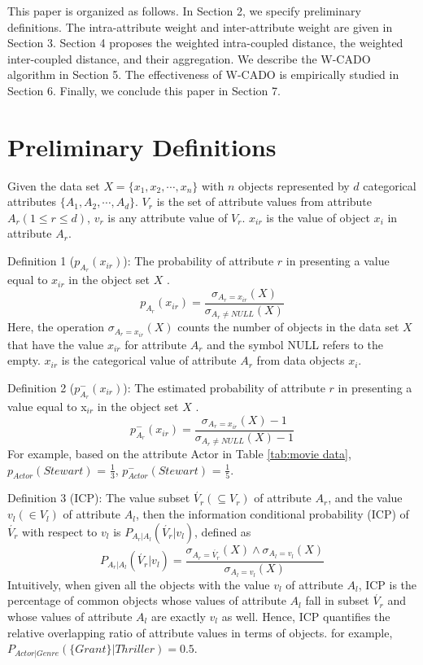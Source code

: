 \documentclass[review]{elsarticle}
\begin{document}
This paper is organized as follows. In Section 2, we specify preliminary definitions. The intra-attribute weight and inter-attribute weight are given in Section 3. Section 4 proposes the weighted intra-coupled distance, the weighted inter-coupled distance, and their aggregation. We describe the W-CADO algorithm in Section 5. The effectiveness of W-CADO is empirically studied in Section 6. Finally, we conclude this paper in Section 7.

\section{Preliminary Definitions}
Given the data set ${X} = \{x_1,x_2,\cdots,x_n\}$ with $n$ objects represented by $d$ categorical attributes $\{A_1,A_2,\cdots,A_d\}$. $V_r$ is the set of attribute values from attribute $A_r (1 \leq r \leq d)$, $v_r$ is any attribute value of $V_r$. $x_{ir}$ is the value of object $x_i$ in attribute $A_r$.

Definition 1 ($p_{A_r}(x_{ir})$): The probability of attribute $r$ in presenting a value equal to $x_{ir}$ in the object set $X$ \cite{TiagoC2015SimilarityMeasure}.
\begin{equation}
p_{A_r}(x_{ir}) = \frac{\sigma_{A_r = x_{ir}}(X)}{\sigma_{A_r \neq NULL}(X)}
\label{equ1}
\end{equation}
Here, the operation $\sigma_{A_r = x_{ir}}(X)$ counts the number of objects in the data set $X$ that have the value $x_{ir}$ for attribute $A_{r}$ and the symbol NULL refers to the empty. $x_{ir}$ is the categorical value of attribute $A_{r}$ from data objects $x_{i}$.

Definition 2 ($p_{A_r}^-(x_{ir})$): The estimated probability of attribute $r$ in presenting a value equal to x$_{ir}$ in the object set $X$ \cite{TiagoC2015SimilarityMeasure}.
\begin{equation}
p_{A_r}^-(x_{ir}) = \frac{\sigma_{A_r = x_{ir}}(X) - 1}{\sigma_{A_r \neq NULL}(X) - 1}
\label{equ2}
\end{equation}
For example, based on the attribute Actor in Table \ref{tab:movie data}, $p_{Actor}(Stewart)$ = $\frac{1}{3}$,  $p_{Actor}^-(Stewart)$ = $\frac{1}{5}$.

Definition 3 (ICP): The value subset $\acute{V_r} (\subseteq V_r)$ of attribute $A_r$, and the value $v_l (\in V_l)$ of attribute $A_l$, then the information conditional probability (ICP) of $\acute{V_r}$ with respect to $v_l$ is $P_{{A_r}|{A_l}}(\acute{V_r} | v_l)$, defined as
\begin{equation}
P_{{A_r}|{A_l}}(\acute{V_r} | v_l) = \frac{\sigma_{A_r = \acute{V_r}}(X) \wedge \sigma_{A_l = v_l}(X)}{\sigma_{A_l = v_l}(X)}
\label{equ3}
\end{equation}
Intuitively, when given all the objects with the value $v_l$ of attribute $A_l$, ICP is the percentage of common objects whose values of attribute $A_l$ fall in subset $\acute{V_r}$ and whose values of attribute $A_l$ are exactly $v_l$ as well. Hence, ICP quantifies the relative overlapping ratio of attribute values in terms of objects. for example, $P_{Actor|Genre}(\{Grant\} | Thriller) = 0.5$.
\end{document}
